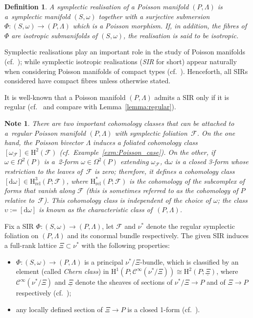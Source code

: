 \documentclass[pdftex]{sigma}
\numberwithin{equation}{section}
\newtheorem{Definition}[Theorem]{Definition}
\newtheorem{Note}[Theorem]{Note}
\newcommand{\de}{\mathrm{d}} %
\newcommand{\SM}{(S,\omega)} %
\newcommand{\PM}{(P,\Lambda)} %
\newcommand{\HH}{\mathrm{H}}
\begin{document}
\begin{Definition}\label{defn:sir}
A {\it symplectic realisation} of a Poisson manifold $\PM$ is a~symplectic manifold $\SM$ together with a surjective submersion $\Phi \colon \SM \to \PM$ which is a Poisson morphism. If, in addition, the f\/ibres of $\Phi$ are isotropic submanifolds of $\SM$, the realisation is said to be {\it isotropic}.
\end{Definition}

Symplectic realisations play an important role in the study of Poisson manifolds (cf.~\cite{cdw}); while symplectic isotropic realisations ({\it SIR} for short) appear naturally when considering Poisson manifolds of compact types (cf.~\cite{PMCT1,PMCT2}). Henceforth, all SIRs considered have compact f\/ibres unless otherwise stated.

It is well-known that a Poisson manifold $\PM$ admits a SIR only if it is regular (cf.~\cite{dd} and compare with Lemma~\ref{lemma:regular}).

\begin{Note}\label{obs:poisson_coho}
There are two important cohomology classes that can be attached to a~regular Poisson manifold $\PM$ with symplectic foliation~$\mathcal{F}$. On the one hand, the Poisson bivector $\Lambda$ induces a foliated cohomology class $[\omega_{\mathcal{F}}] \in \HH^2(\mathcal{F})$ (cf.\ Example~\ref{exm:Poisson_case}). On the other, if $\omega \in \Omega^2(P)$ is a~2-form $\omega \in \Omega^2(P)$ extending $\omega_{\mathcal{F}}$, $\de \omega$ is a closed 3-form whose restriction to the leaves of~$\mathcal{F}$ is zero; therefore, it def\/ines a cohomology class $[\de \omega ] \in \HH^3_{\mathrm{rel}}(P;\mathcal{F})$, where $\HH^*_{\mathrm{rel}}(P;\mathcal{F})$ is the cohomology of the subcomplex of forms that vanish along $\mathcal{F}$ (this is sometimes referred to as the cohomology of $P$ {\em relative} to~$\mathcal{F}$). This cohomology class is independent of the choice of $\omega$; the class $\upsilon:=[\de \omega]$ is known as the {\it characteristic class} of~$\PM$.
\end{Note}

Fix a SIR $\Phi \colon \SM \to \PM$, let $\mathcal{F}$ and $\nu^*$ denote the regular symplectic foliation on $\PM$ and its conormal bundle respectively. The given SIR induces a full-rank lattice $\Xi \subset \nu^*$ with the following properties:
\begin{itemize} \itemsep=0pt
\item $\Phi \colon \SM \to \PM$ is a principal $\nu^*/\Xi$-bundle, which is classif\/ied by an element (called {\it Chern class}) in $\HH^1 (P;\mathcal{C}^{\infty} (\nu^*/\Xi ) ) \cong \HH^2(P;\underline{\Xi})$, where $\mathcal{C}^{\infty}(\nu^*/\Xi)$ and $\underline{\Xi}$ denote the sheaves of sections of $\nu^*/ \Xi \to P$ and of $\Xi \to P$ respectively (cf.\ \cite[Corollary~2]{dd});
\item any locally def\/ined section of $\Xi \to P$ is a closed 1-form (cf.\ \cite[Corollary~1]{dd}).
\end{itemize}
\end{document}
